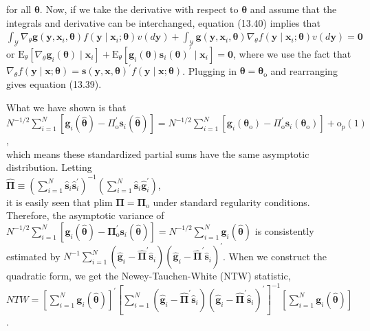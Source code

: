 \documentclass[10pt]{article}
\begin{document}
for all $\boldsymbol{\theta}$. Now, if we take the derivative with respect to $\boldsymbol{\theta}$ and assume that the integrals and derivative can be interchanged, equation (13.40) implies that\\
$\int_{\mathscr{Y}} \nabla_{\theta} \mathbf{g}\left(\mathbf{y}, \mathbf{x}_{i}, \boldsymbol{\theta}\right) f\left(\mathbf{y} \mid \mathbf{x}_{i} ; \boldsymbol{\theta}\right) v(d \mathbf{y})+\int_{\mathscr{Y}} \mathbf{g}\left(\mathbf{y}, \mathbf{x}_{i}, \boldsymbol{\theta}\right) \nabla_{\theta} f\left(\mathbf{y} \mid \mathbf{x}_{i} ; \boldsymbol{\theta}\right) v(d \mathbf{y})=\mathbf{0}$\\
or $\mathrm{E}_{\theta}\left[\nabla_{\theta} \mathbf{g}_{i}(\boldsymbol{\theta}) \mid \mathbf{x}_{i}\right]+\mathrm{E}_{\theta}\left[\mathbf{g}_{i}(\boldsymbol{\theta}) \mathbf{s}_{i}(\boldsymbol{\theta})^{\prime} \mid \mathbf{x}_{i}\right]=\mathbf{0}$, where we use the fact that $\nabla_{\theta} f(\mathbf{y} \mid \mathbf{x} ; \boldsymbol{\theta})= \mathbf{s}(\mathbf{y}, \mathbf{x}, \boldsymbol{\theta})^{\prime} f(\mathbf{y} \mid \mathbf{x} ; \boldsymbol{\theta})$. Plugging in $\boldsymbol{\theta}=\boldsymbol{\theta}_{\mathrm{o}}$ and rearranging gives equation (13.39).

What we have shown is that\\
$N^{-1 / 2} \sum_{i=1}^{N}\left[\mathbf{g}_{i}(\hat{\boldsymbol{\theta}})-\Pi_{\mathrm{o}}^{\prime} \mathbf{s}_{i}(\hat{\boldsymbol{\theta}})\right]=N^{-1 / 2} \sum_{i=1}^{N}\left[\mathbf{g}_{i}\left(\boldsymbol{\theta}_{\mathrm{o}}\right)-\Pi_{\mathrm{o}}^{\prime} \mathbf{s}_{i}\left(\boldsymbol{\theta}_{\mathrm{o}}\right)\right]+\mathrm{o}_{p}(1)$,\\
which means these standardized partial sums have the same asymptotic distribution. Letting\\
$\hat{\boldsymbol{\Pi}} \equiv\left(\sum_{i=1}^{N} \hat{\mathbf{s}}_{i} \hat{\mathbf{s}}_{i}^{\prime}\right)^{-1}\left(\sum_{i=1}^{N} \hat{\mathbf{s}}_{i} \hat{\mathbf{g}}_{i}^{\prime}\right)$,\\
it is easily seen that plim $\mathbf{\boldsymbol { \Pi }}=\boldsymbol{\Pi}_{\mathrm{o}}$ under standard regularity conditions. Therefore, the asymptotic variance of $N^{-1 / 2} \sum_{i=1}^{N}\left[\mathbf{g}_{i}(\hat{\boldsymbol{\theta}})-\boldsymbol{\Pi}_{\mathrm{o}}^{\prime} \mathbf{s}_{i}(\hat{\boldsymbol{\theta}})\right]=N^{-1 / 2} \sum_{i=1}^{N} \mathbf{g}_{i}(\hat{\boldsymbol{\theta}})$ is consistently estimated by $N^{-1} \sum_{i=1}^{N}\left(\hat{\mathbf{g}}_{i}-\hat{\boldsymbol{\Pi}}^{\prime} \hat{\mathbf{s}}_{i}\right)\left(\hat{\mathbf{g}}_{i}-\hat{\boldsymbol{\Pi}}^{\prime} \hat{\mathbf{s}}_{i}\right)^{\prime}$. When we construct the quadratic form, we get the Newey-Tauchen-White (NTW) statistic,\\
$N T W=\left[\sum_{i=1}^{N} \mathbf{g}_{i}(\hat{\boldsymbol{\theta}})\right]^{\prime}\left[\sum_{i=1}^{N}\left(\hat{\mathbf{g}}_{i}-\hat{\boldsymbol{\Pi}}^{\prime} \hat{\mathbf{s}}_{i}\right)\left(\hat{\mathbf{g}}_{i}-\hat{\boldsymbol{\Pi}}^{\prime} \hat{\mathbf{s}}_{i}\right)^{\prime}\right]^{-1}\left[\sum_{i=1}^{N} \mathbf{g}_{i}(\hat{\boldsymbol{\theta}})\right]$.
\end{document}
